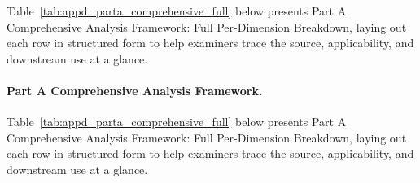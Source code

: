 {\tablestripes\tablefontsize

\noindent Table~\ref{tab:appd_parta_comprehensive_full} below presents Part A Comprehensive Analysis Framework: Full Per-Dimension Breakdown, laying out each row in structured form to help examiners trace the source, applicability, and downstream use at a glance. %
\paragraph{Part A Comprehensive Analysis Framework.} %
\noindent Table~\ref{tab:appd_parta_comprehensive_full} below presents Part A Comprehensive Analysis Framework: Full Per-Dimension Breakdown, laying out each row in structured form to help examiners trace the source, applicability, and downstream use at a glance. %



}
